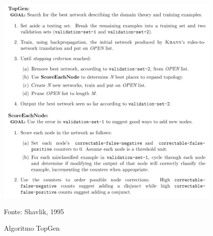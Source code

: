 \label{Cap_6}

\begin{figure}[H] 
	\begin{center}
		\caption{Algoritmo TopGen}
		\includegraphics[scale=0.5]{imagens/AlgoritmoTopGen.png}
		\label{fig:AlgoritmoTopGen}
		\centerline{Fonte: Shavlik, 1995}
	\end{center} 
\end{figure}



